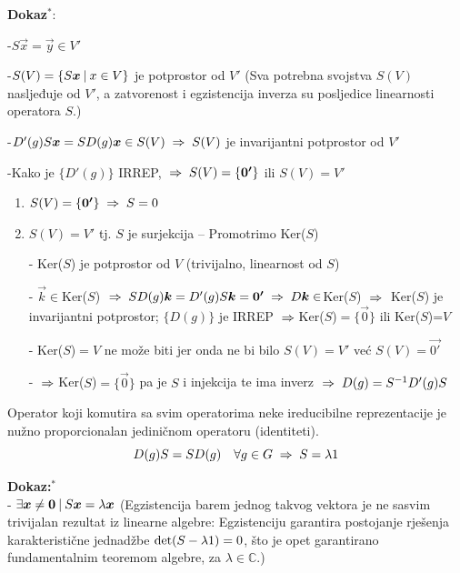\textbf{Dokaz}$^{*}$: 

-$S\vec{x}=\vec{y}\in V'$

-$S(V)=\{S\vec{x} \td x \in V \}$ je potprostor od $V'$ (Sva potrebna svojstva
  $S(V)$  nasljeđuje od  $V'$, a zatvorenost i egzistencija inverza su 
 posljedice linearnosti operatora $S$.)


-$D'(g)S\vec{x}=SD(g)\vec{x} \in S(V) \imp  S(V)$ je invarijantni
   potprostor od $V'$

-Kako je $\{D'(g)\}$ IRREP, $\imp S(V)=\{\vec{0'}\}$ ili $S(V)=V'$

\begin{enumerate}
\item $ S(V)=\{\vec{0'}\} \imp  S=0$

\item $S(V)=V'$ tj. $S$ je surjekcija -- Promotrimo Ker($S$) 

  - Ker($S$) je potprostor od $V$ (trivijalno, linearnost od $S$)

  - $\vec{k}\in$Ker($S$) $\imp S D(g) \vec{k} = D'(g)S\vec{k} =
    \vec{0'} \imp D\vec{k} \in $Ker($S$) $\;\Rightarrow\;$ Ker($S$) je
    invarijantni potprostor; $\{D(g)\}$ je IRREP $\;\Rightarrow\;
    $Ker($S$)$=\{\vec{0}\}$ ili Ker($S$)=$V$

  - Ker($S$)$=V$ ne može biti jer onda ne bi bilo $S(V)=V'$ već
      $S(V)=\vec{0'}$

  - $\;\Rightarrow\; $Ker($S$)$=\{\vec{0}\}$ pa je $S$ i injekcija te ima inverz
    $\;\Rightarrow\; D(g)=S^{-1}D'(g)S$


\end{enumerate}

\begin{teorem}
Operator koji komutira sa svim operatorima neke ireducibilne 
reprezentacije je nužno proporcionalan jediničnom operatoru
(identiteti).
\begin{displaymath}
  D(g)S=SD(g) \quad \forall g\in G \;\Rightarrow\; S = \lambda 1
\end{displaymath}
\end{teorem}

\textbf{Dokaz:}$^{*}$ \\

- $\exists \vec{x}\neq\vec{0} \td S\vec{x}=\lambda\vec{x}$ (Egzistencija barem
  jednog takvog vektora je ne sasvim trivijalan rezultat iz linearne algebre:
  Egzistenciju garantira postojanje rješenja karakteristične
  jednadžbe $\det(S - \lambda 1)=0$, što je opet garantirano fundamentalnim
   teoremom algebre, za $\lambda \in \mathbb{C}$.)

